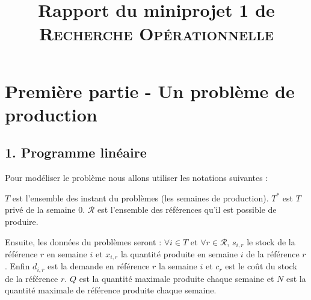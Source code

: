 \documentclass{rapport}
\title{Rapport du miniprojet 1 de \textsc{Recherche Opérationnelle}}
\begin{document}
\maketitle

\section{Première partie - Un problème de production}

\subsection{1. Programme linéaire}

Pour modéliser le problème nous allons utiliser les notations suivantes :

$T$ est l'ensemble des instant du problèmes (les semaines de production). $T^*$ est $T$ privé de la semaine $0$. $\mathcal{R}$ est l'ensemble des références qu'il est possible de produire.

Ensuite, les données du problèmes seront : $\forall i \in T$ et $\forall r \in \mathcal{R}$, $s_{i,r}$ le stock de la référence $r$ en semaine $i$ et $x_{i,r}$ la quantité produite en semaine $i$ de la référence $r$. Enfin $d_{i,r}$ est la demande en référence $r$ la semaine $i$ et $c_r$ est le coût du stock de la référence $r$. $Q$ est la quantité maximale produite chaque semaine et $N$ est la quantité maximale de référence produite chaque semaine.
\ \\
\end{document}
